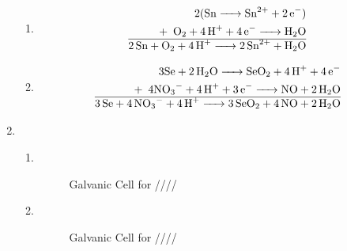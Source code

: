 \documentclass[12pt]{article}
\begin{document}
\begin{enumerate}
\begin{enumerate}
      \item 

        \begin{equation}
          \begin{split}
            2(\ce{Sn -> Sn^2+ + 2e-})\\
            +\,\,\,\ce{O2 + 4H+ + 4e- -> H2O}\\
            \hline
            \ce{2Sn + O2 + 4H+ -> 2Sn^2+ + H2O}
          \end{split}
          \label{2}
        \end{equation}

      \item 

        \begin{equation}
          \begin{split}
            3\ce{Se + 2H2O -> SeO2 + 4H+ + 4e-}\\
            +\,\,\,4\ce{NO3- + 4H+ + 3e- -> NO + 2H2O}\\
            \hline
            \ce{3Se + 4NO3- + 4H+ -> 3SeO2 + 4NO + 2H2O}
          \end{split}
          \label{3}
        \end{equation}

    \end{enumerate}

    \newpage

  \item

    \begin{enumerate}

      \item \textbf{ }\\

        \begin{center}
          \begin{figure}[h!]
            \centering
            
            \caption{Galvanic Cell for ////}
            \label{fig:1}
          \end{figure}
        \end{center}

      \item \textbf{ }\\

        \begin{center}
          \begin{figure}[h!]
            \centering
            
            \caption{Galvanic Cell for ////}
            \label{fig:2}
          \end{figure}
        \end{center}


\end{enumerate}
\end{enumerate}
\end{document}
